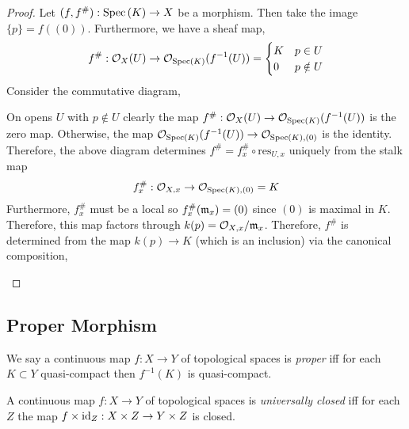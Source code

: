 \documentclass[12pt]{article}
\begin{document}
\begin{proof}
Let $(f, f^\#) : \mathrm{Spec}\left( K \right) \to X$ be a morphism. Then take the image $\{p\} = f((0))$. Furthermore, we have a sheaf map,
\[ f^\# : \mathcal{O}_{X}(U) \to \mathcal{O}_{\mathrm{Spec}\left( K \right)}(f^{-1}(U)) 
= \begin{cases}
K & p \in U
\\
0 & p \notin U 
\end{cases} \] 
Consider the commutative diagram,
\begin{center}
\end{center}
On opens $U$ with $p \notin U$ clearly the map $f^\# : \mathcal{O}_{X}(U) \to \mathcal{O}_{\mathrm{Spec}\left( K \right)}(f^{-1}(U))$ is the zero map. Otherwise, the map $\mathcal{O}_{\mathrm{Spec}\left( K \right)}(f^{-1}(U)) \to \mathcal{O}_{\mathrm{Spec}\left( K \right), (0)}$ is the identity. Therefore, the above diagram determines $f^\# = f^\#_x \circ \mathrm{res}_{U, x}$ uniquely from the stalk map 
\[f^\#_x : \mathcal{O}_{X, x} \to \mathcal{O}_{\mathrm{Spec}\left( K \right), (0)} = K \]
Furthermore, $f^\#_x$ must be a local so $f^\#_x(\mathfrak{m}_x) = (0)$ since $(0)$ is maximal in $K$. Therefore, this map factors through $k(p) = \mathcal{O}_{X, x} / \mathfrak{m}_x$. Therefore, $f^\#$ is determined from the map $k(p) \to K$ (which is an inclusion) via the canonical composition,
\begin{center}
\end{center} 
\end{proof}

\subsection{Proper Morphism}

\begin{definition}
We say a continuous map $f : X \to Y$ of topological spaces is \textit{proper} iff for each $K \subset Y$ quasi-compact then $f^{-1}(K)$ is quasi-compact.
\end{definition}

\begin{definition}
A continuous map $f : X \to Y$ of topological spaces is \textit{universally closed} iff for each $Z$ the map $f \times \mathrm{id}_Z : X \times Z \to Y \times Z$ is closed. 
\end{definition}
\end{document}
